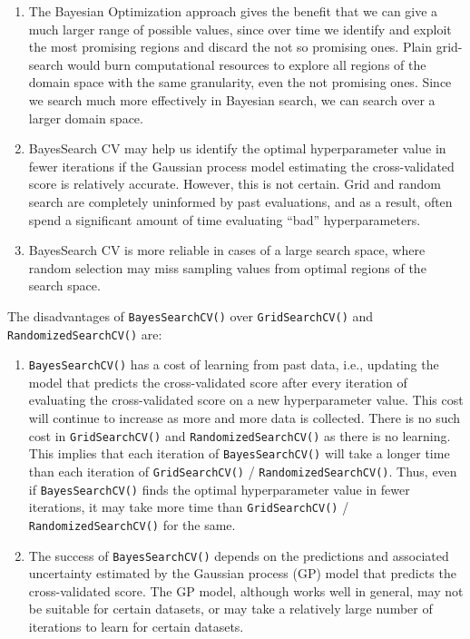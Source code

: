 \documentclass[
  letterpaper,
  DIV=11,
  numbers=noendperiod]{scrreprt}
\begin{document}
\begin{enumerate}
\def\labelenumi{\arabic{enumi}.}
\item
  The Bayesian Optimization approach gives the benefit that we can give
  a much larger range of possible values, since over time we identify
  and exploit the most promising regions and discard the not so
  promising ones. Plain grid-search would burn computational resources
  to explore all regions of the domain space with the same granularity,
  even the not promising ones. Since we search much more effectively in
  Bayesian search, we can search over a larger domain space.
\item
  BayesSearch CV may help us identify the optimal hyperparameter value
  in fewer iterations if the Gaussian process model estimating the
  cross-validated score is relatively accurate. However, this is not
  certain. Grid and random search are completely uninformed by past
  evaluations, and as a result, often spend a significant amount of time
  evaluating ``bad'' hyperparameters.
\item
  BayesSearch CV is more reliable in cases of a large search space,
  where random selection may miss sampling values from optimal regions
  of the search space.
\end{enumerate}

The disadvantages of \texttt{BayesSearchCV()} over
\texttt{GridSearchCV()} and \texttt{RandomizedSearchCV()} are:

\begin{enumerate}
\def\labelenumi{\arabic{enumi}.}
\item
  \texttt{BayesSearchCV()} has a cost of learning from past data, i.e.,
  updating the model that predicts the cross-validated score after every
  iteration of evaluating the cross-validated score on a new
  hyperparameter value. This cost will continue to increase as more and
  more data is collected. There is no such cost in
  \texttt{GridSearchCV()} and \texttt{RandomizedSearchCV()} as there is
  no learning. This implies that each iteration of
  \texttt{BayesSearchCV()} will take a longer time than each iteration
  of \texttt{GridSearchCV()} / \texttt{RandomizedSearchCV()}. Thus, even
  if \texttt{BayesSearchCV()} finds the optimal hyperparameter value in
  fewer iterations, it may take more time than \texttt{GridSearchCV()} /
  \texttt{RandomizedSearchCV()} for the same.
\item
  The success of \texttt{BayesSearchCV()} depends on the predictions and
  associated uncertainty estimated by the Gaussian process (GP) model
  that predicts the cross-validated score. The GP model, although works
  well in general, may not be suitable for certain datasets, or may take
  a relatively large number of iterations to learn for certain datasets.
\end{enumerate}
\end{document}
